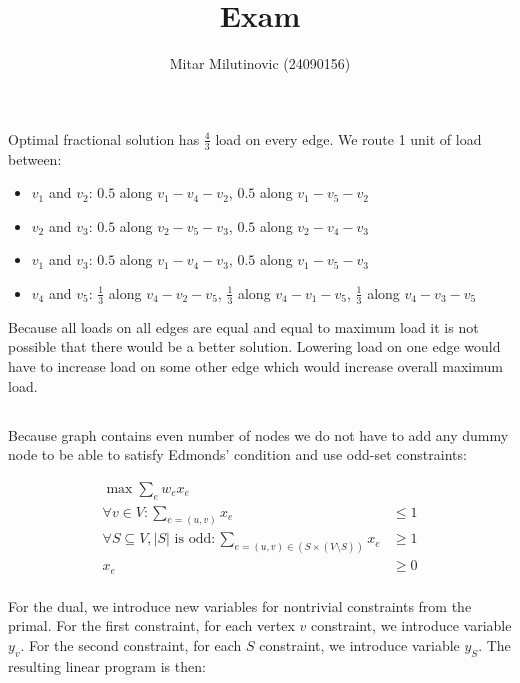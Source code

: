 \documentclass[a4paper,11pt,oneside,onecolumn]{article}
\title{Exam}
\author{Mitar Milutinovic (24090156)}
\date{}
\begin{document}
\maketitle

\section{}

\subsection{}

Optimal fractional solution has $\frac{4}{3}$ load on every edge. We route 1 unit of load between:
\begin{itemize}
\item $v_1$ and $v_2$: $0.5$ along $v_1-v_4-v_2$, $0.5$ along $v_1-v_5-v_2$
\item $v_2$ and $v_3$: $0.5$ along $v_2-v_5-v_3$, $0.5$ along $v_2-v_4-v_3$
\item $v_1$ and $v_3$: $0.5$ along $v_1-v_4-v_3$, $0.5$ along $v_1-v_5-v_3$
\item $v_4$ and $v_5$: $\frac{1}{3}$ along $v_4-v_2-v_5$, $\frac{1}{3}$ along $v_4-v_1-v_5$, $\frac{1}{3}$ along $v_4-v_3-v_5$
\end{itemize}

Because all loads on all edges are equal and equal to maximum load it is not possible that there would be a better solution.
Lowering load on one edge would have to increase load on some other edge which would increase overall maximum load.

\subsection{}

Because graph contains even number of nodes we do not have to add any dummy node to be able to satisfy Edmonds' condition and
use odd-set constraints:

\begin{align*}
\max \sum_e w_e x_e &  \\
\forall v \in V: \sum_{e=(u,v)} x_e & \le 1 \\
\forall S \subseteq V, |S| \textrm{ is odd}: \sum_{e=(u,v) \in (S \times (V \setminus S))} x_e & \ge 1 \\
x_e & \ge 0 \\
\end{align*}

For the dual, we introduce new variables for nontrivial constraints from the primal. For the first constraint, for each
vertex $v$ constraint, we introduce variable $y_v$. For the second constraint, for each $S$ constraint, we introduce variable
$y_S$. The resulting linear program is then:
\end{document}

